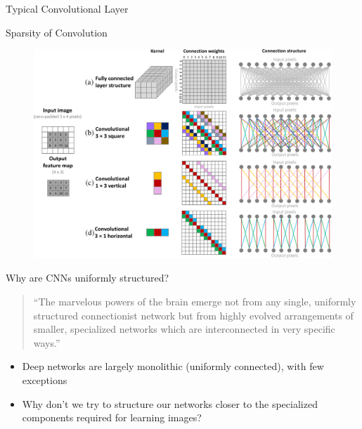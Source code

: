 \documentclass[t,xcolor=dvipsnames]{beamer}
\begin{document}
\begin{frame}{Typical Convolutional Layer}
\begin{figure}
{
    }
\end{figure}
\end{frame}

\begin{frame}{Sparsity of Convolution}
\begin{figure}
    \includegraphics[width=\textwidth]{../Figs/PDF/sparseconn3}
\end{figure}
\end{frame}
\begin{frame}{Why are CNNs uniformly structured?}
\begin{quote}
``The marvelous powers of the brain emerge not from any single, uniformly structured
connectionist network but from highly evolved arrangements of smaller, specialized
networks which are interconnected in very specific ways.''\\
\end{quote}
\begin{itemize}
    \item Deep networks are largely monolithic (uniformly connected), with few exceptions
    \item Why don't we try to structure our networks closer to the specialized components required for learning images?
\end{itemize}
\end{frame}
\end{document}
